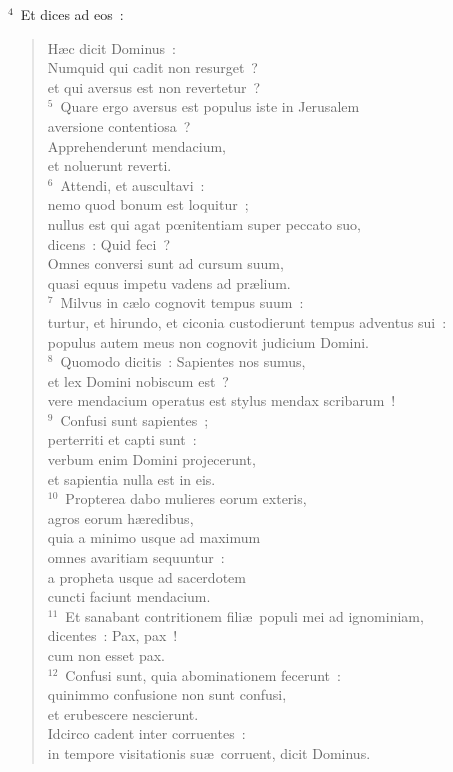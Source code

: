 ${}^{4}$~Et dices ad eos~: \begin{verse}H\ae c dicit Dominus~:\\ Numquid qui cadit non resurget~?\\ et qui aversus est non revertetur~?\\
${}^{5}$~Quare ergo aversus est populus iste in Jerusalem\\ aversione contentiosa~?\\ Apprehenderunt mendacium,\\ et noluerunt reverti.\\
${}^{6}$~Attendi, et auscultavi~:\\ nemo quod bonum est loquitur~;\\ nullus est qui agat pœnitentiam super peccato suo,\\ dicens~: Quid feci~?\\ Omnes conversi sunt ad cursum suum,\\ quasi equus impetu vadens ad pr\ae lium.\\
${}^{7}$~Milvus in c\ae lo cognovit tempus suum~:\\ turtur, et hirundo, et ciconia custodierunt tempus adventus sui~:\\ populus autem meus non cognovit judicium Domini.\\
${}^{8}$~Quomodo dicitis~: Sapientes nos sumus,\\ et lex Domini nobiscum est~?\\ vere mendacium operatus est stylus mendax scribarum~!\\
${}^{9}$~Confusi sunt sapientes~;\\ perterriti et capti sunt~:\\ verbum enim Domini projecerunt,\\ et sapientia nulla est in eis.\\
${}^{10}$~Propterea dabo mulieres eorum exteris,\\ agros eorum h\ae redibus,\\ quia a minimo usque ad maximum\\ omnes avaritiam sequuntur~:\\ a propheta usque ad sacerdotem\\ cuncti faciunt mendacium.\\
${}^{11}$~Et sanabant contritionem fili\ae\ populi mei ad ignominiam,\\ dicentes~: Pax, pax~!\\ cum non esset pax.\\
${}^{12}$~Confusi sunt, quia abominationem fecerunt~:\\ quinimmo confusione non sunt confusi,\\ et erubescere nescierunt.\\ Idcirco cadent inter corruentes~:\\ in tempore visitationis su\ae\ corruent, dicit Dominus.\\

\end{verse}
